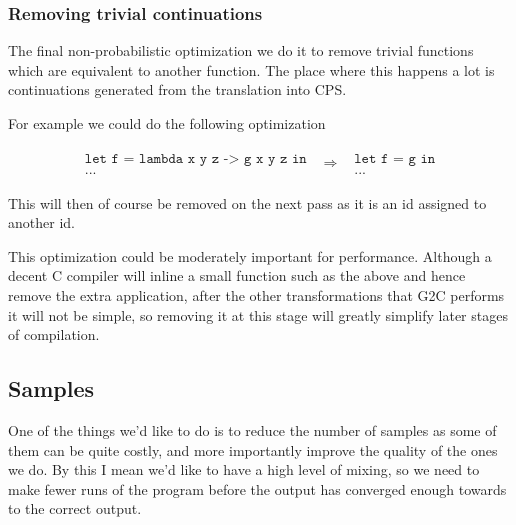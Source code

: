 \documentclass[a4paper]{article}
\newcommand{\optimization}[2]{
	\[
		\begin{array}{rcl}
			#1 & \Rightarrow & #2
		\end{array}
	\]
}
\begin{document}

\subsubsection{Removing trivial continuations}

The final non-probabilistic optimization we do it to remove trivial functions which are equivalent to another function. The place where this happens a lot is continuations generated from the translation into CPS.

For example we could do the following optimization
\optimization{
	\begin{array}{l}
		\texttt{let f = lambda x y z -> g x y z in} \\
		\texttt{...}
	\end{array}
}{
	\begin{array}{l}
		\texttt{let f = g in} \\
		\texttt{...}
	\end{array}
}
This will then of course be removed on the next pass as it is an id assigned to another id.

This optimization could be moderately important for performance. Although a decent C compiler will inline a small function such as the above and hence remove the extra application, after the other transformations that G2C performs it will not be simple, so removing it at this stage will greatly simplify later stages of compilation.




\subsection{Samples}

One of the things we'd like to do is to reduce the number of samples as some of them can be quite costly, and more importantly improve the quality of the ones we do. By this I mean we'd like to have a high level of mixing, so we need to make fewer runs of the program before the output has converged enough towards to the correct output.
\end{document}
